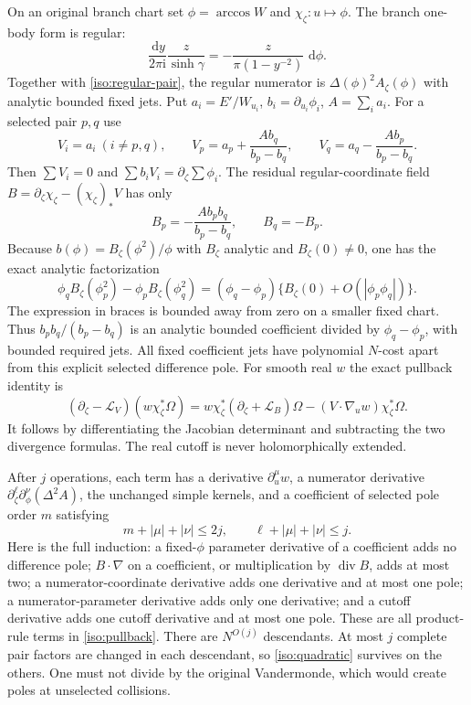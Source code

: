 \documentclass[11pt]{article}
\numberwithin{equation}{section}
\theoremstyle{definition}
\newcommand{\ii}{\mathrm i}
\newcommand{\dd}{\,\mathrm d}
\begin{document}
On an original branch chart set $\phi=\arccos W$ and
$\chi_\zeta:u\mapsto\phi$. The branch one-body form is regular:
\[
 \frac{\dd y}{2\pi\ii}\frac{z}{\sinh\gamma}
 =-\frac{z}{\pi(1-y^{-2})}\,\dd\phi.
\]
Together with \eqref{iso:regular-pair}, the regular numerator is
$\Delta(\phi)^2A_\zeta(\phi)$ with analytic bounded fixed jets.
Put $a_i=E'/W_{u_i}$, $b_i=\partial_{u_i}\phi_i$, $A=\sum_i a_i$.
For a selected pair $p,q$ use
\[
 V_i=a_i\ (i\ne p,q),\qquad
 V_p=a_p+\frac{Ab_q}{b_p-b_q},\qquad
 V_q=a_q-\frac{Ab_p}{b_p-b_q}.
\]
Then $\sum V_i=0$ and $\sum b_iV_i=\partial_\zeta\sum\phi_i$.
The residual regular-coordinate field
$B=\partial_\zeta\chi_\zeta-(\chi_\zeta)_*V$ has only
\[
 B_p=-\frac{Ab_pb_q}{b_p-b_q},\qquad B_q=-B_p.
\]
Because $b(\phi)=B_\zeta(\phi^2)/\phi$ with $B_\zeta$ analytic
and $B_\zeta(0)\ne0$, one has the exact analytic factorization
\[
 \phi_qB_\zeta(\phi_p^2)-\phi_pB_\zeta(\phi_q^2)
 =(\phi_q-\phi_p)
       \{B_\zeta(0)+O(|\phi_p\phi_q|)\}.
\]
The expression in braces is bounded away from zero on a smaller fixed
chart. Thus $b_pb_q/(b_p-b_q)$ is an analytic bounded coefficient
divided by $\phi_q-\phi_p$, with bounded required jets.
All fixed coefficient jets have polynomial
$N$-cost apart from this explicit selected difference pole.
For smooth real $w$ the exact pullback identity is
\begin{equation}
 (\partial_\zeta-\mathcal L_V)(w\chi_\zeta^*\Omega)
 =w\chi_\zeta^*(\partial_\zeta+\mathcal L_B)\Omega
 -(V\cdot\nabla_u w)\chi_\zeta^*\Omega.
 \label{iso:pullback}
\end{equation}
It follows by differentiating the Jacobian determinant and subtracting
the two divergence formulas. The real cutoff is never holomorphically
extended.

After $j$ operations, each term has a derivative
$\partial_u^\mu w$, a numerator derivative
$\partial_\zeta^\ell\partial_\phi^\nu(\Delta^2A)$, the unchanged
simple kernels, and a coefficient of selected pole order $m$ satisfying
\begin{equation}
 m+|\mu|+|\nu|\le2j,\qquad
 \ell+|\mu|+|\nu|\le j.
 \label{iso:filtration}
\end{equation}
Here is the full induction: a fixed-$\phi$ parameter derivative of a
coefficient adds no difference pole; $B\cdot\nabla$ on a coefficient,
or multiplication by $\operatorname{div}B$, adds at most two; a
numerator-coordinate derivative adds one derivative and at most one
pole; a numerator-parameter derivative adds only one derivative; and a
cutoff derivative adds one cutoff derivative and at most one pole.
These are all product-rule terms in \eqref{iso:pullback}.
There are $N^{O(j)}$ descendants. At most $j$ complete pair factors are
changed in each descendant, so \eqref{iso:quadratic} survives on the
others. One must not divide by the original Vandermonde, which would
create poles at unselected collisions.
\end{document}
